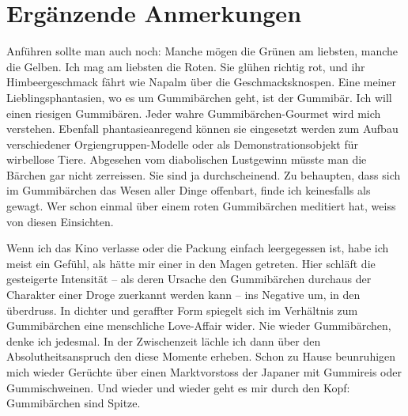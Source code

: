 \section{Ergänzende Anmerkungen}

Anführen sollte man auch noch: Manche mögen die Grünen am liebsten, manche die Gelben. Ich mag am liebsten die Roten. Sie glühen richtig rot, und ihr Himbeergeschmack fährt wie Napalm über die Geschmacksknospen. Eine meiner Lieblingsphantasien, wo es um Gummibärchen geht, ist der Gummibär. Ich will einen riesigen Gummibären. Jeder wahre Gummibärchen-Gourmet wird mich verstehen. Ebenfall phantasieanregend können sie eingesetzt werden zum Aufbau verschiedener Orgiengruppen-Modelle oder als Demonstrationsobjekt für wirbellose Tiere. Abgesehen vom diabolischen Lustgewinn müsste man die Bärchen gar nicht zerreissen. Sie sind ja durchscheinend. Zu behaupten, dass sich im Gummibärchen das Wesen aller Dinge offenbart, finde ich keinesfalls als gewagt. Wer schon einmal über einem roten Gummibärchen meditiert hat, weiss von diesen Einsichten.

Wenn ich das Kino verlasse oder die Packung einfach leergegessen ist, habe ich meist ein Gefühl, als hätte mir einer in den Magen getreten. Hier schläft die gesteigerte Intensität -- als deren Ursache den Gummibärchen durchaus der Charakter einer Droge zuerkannt werden kann -- ins Negative um, in den überdruss. In dichter und geraffter Form spiegelt sich im Verhältnis zum Gummibärchen eine menschliche Love-Affair wider. Nie wieder Gummibärchen, denke ich jedesmal. In der Zwischenzeit lächle ich dann über den Absolutheitsanspruch den diese Momente erheben. Schon zu Hause beunruhigen mich wieder Gerüchte über einen Marktvorstoss der Japaner mit Gummireis oder Gummischweinen. Und wieder und wieder geht es mir durch den Kopf: Gummibärchen sind Spitze.